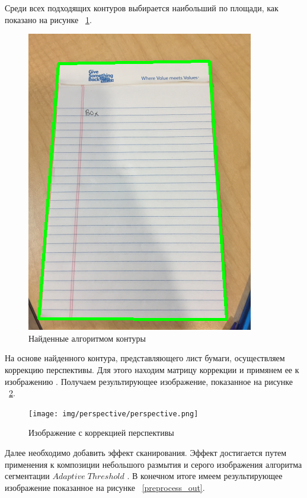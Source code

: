 Среди всех подходящих контуров выбирается наибольший по площади, как показано на рисунке ~\ref{contours}.
\begin{figure}
    \includegraphics[scale=0.25]{img/perspective/contours.png}
    \caption{Найденные алгоритмом контуры}
    \label{contours}
\end{figure}


На основе найденного контура, представляющего лист бумаги, осуществляем коррекцию перспективы. Для этого находим матрицу коррекции \cite{opencv_perspective_transform} и примянем ее к изображению \cite{opencv_warp_perspective}.
Получаем результирующее изображение, показанное на рисунке ~\ref{perspective_correction}.
\begin{figure}
    \texttt{[image: img/perspective/perspective.png]}
    \caption{Изображение с коррекцией перспективы}
    \label{perspective_correction}
\end{figure}

Далее необходимо добавить эффект сканирования. Эффект достигается путем применения к композиции небольшого размытия и серого изображения алгоритма сегментации $Adaptive\;Threshold$ \cite{opencv_threshold}. 
В конечном итоге имеем результирующее изображение показанное на рисунке ~\ref{preprocess_out}.

